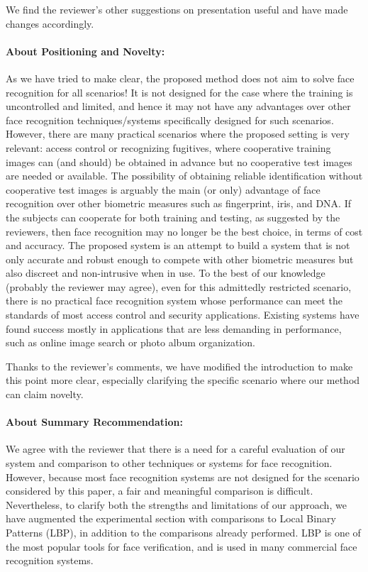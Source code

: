 \documentclass[11pt]{article}
\begin{document}
We find the reviewer's other suggestions on presentation useful and have made changes accordingly. 

\paragraph{About Positioning and Novelty:}
As we have tried to make clear, the proposed method does not aim to solve face 
recognition for all scenarios! It is not designed for the case where the training is uncontrolled and limited, and hence it
may not have any advantages over other face recognition techniques/systems specifically designed for such scenarios. 
However, there are many practical scenarios where the proposed setting is very relevant: access control
or recognizing fugitives, where cooperative training images can (and should) be obtained in advance but no cooperative test
images are needed or available. The possibility of obtaining reliable identification without cooperative test images is arguably the main (or only) advantage of 
face recognition over other biometric measures such as fingerprint, iris, and DNA. 
If the subjects can cooperate for both training and testing, as suggested by the reviewers, then face 
recognition may no longer be the best choice, in terms of cost and accuracy. The proposed system is an attempt
to build a system that is not only accurate and robust enough to compete with other biometric measures but also 
discreet and non-intrusive when in use. To the best of our knowledge (probably the reviewer may agree), even 
for this admittedly restricted scenario, there is no practical face recognition system whose performance can meet
the standards of most access control and security applications. Existing systems have found success  mostly in applications
that are less demanding in performance, such as online image search or photo album organization. 

Thanks to the reviewer's comments, we have modified the introduction to make this point more clear, especially clarifying the specific scenario where our method can claim novelty.

\paragraph{About Summary Recommendation:} We agree with the reviewer that there is a need for a careful evaluation of our system and comparison to other techniques or systems for face recognition. However, because most face recognition systems are not designed for the scenario considered by this paper, a fair and meaningful comparison is difficult. Nevertheless, to clarify both the strengths and limitations of our approach, we have augmented the experimental section with comparisons to Local Binary Patterns (LBP), in addition to the comparisons already performed. LBP is one of the most popular tools for face verification, and is used in many commercial face recognition systems. 
\end{document}
